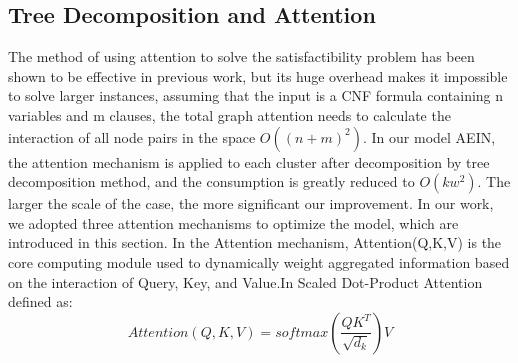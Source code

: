 \subsection{Tree Decomposition and Attention}
The method of using attention to solve the satisfactibility problem has been shown to be effective in previous work, but its huge overhead makes it impossible to solve larger instances, assuming that the input is a CNF formula containing n variables and m clauses, the total graph attention needs to calculate the interaction of all node pairs in the space \(O((n+m)^2)\). In our model AEIN, the attention mechanism is applied to each cluster after decomposition by tree decomposition method, and the consumption is greatly reduced to \(O(kw^2)\). The larger the scale of the case, the more significant our improvement.
In our work, we adopted three attention mechanisms to optimize the model, which are introduced in this section.
In the Attention mechanism, Attention(Q,K,V) is the core computing module used to dynamically weight aggregated information based on the interaction of Query, Key, and Value.In Scaled Dot-Product Attention defined as:
\begin{equation}
Attention(Q,K,V)=softmax(\frac{QK^T}{\sqrt{d_k}})V
\end{equation}
